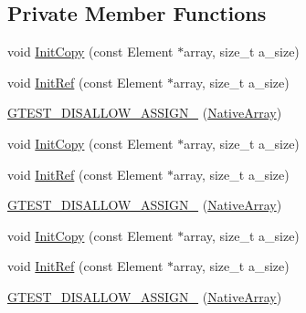\subsection*{Private Member Functions}
\begin{DoxyCompactItemize}
\item 
void \mbox{\hyperlink{classtesting_1_1internal_1_1_native_array_a8c0069cc09f559785fe4923fc118056f}{Init\+Copy}} (const Element $\ast$array, size\+\_\+t a\+\_\+size)
\item 
void \mbox{\hyperlink{classtesting_1_1internal_1_1_native_array_ac6ad6d79e17e2c98a9d4d684afcb7f79}{Init\+Ref}} (const Element $\ast$array, size\+\_\+t a\+\_\+size)
\item 
\mbox{\hyperlink{classtesting_1_1internal_1_1_native_array_a6633f3eab6947d4502fb1c69f95be66e}{G\+T\+E\+S\+T\+\_\+\+D\+I\+S\+A\+L\+L\+O\+W\+\_\+\+A\+S\+S\+I\+G\+N\+\_\+}} (\mbox{\hyperlink{classtesting_1_1internal_1_1_native_array}{Native\+Array}})
\item 
void \mbox{\hyperlink{classtesting_1_1internal_1_1_native_array_a8c0069cc09f559785fe4923fc118056f}{Init\+Copy}} (const Element $\ast$array, size\+\_\+t a\+\_\+size)
\item 
void \mbox{\hyperlink{classtesting_1_1internal_1_1_native_array_ac6ad6d79e17e2c98a9d4d684afcb7f79}{Init\+Ref}} (const Element $\ast$array, size\+\_\+t a\+\_\+size)
\item 
\mbox{\hyperlink{classtesting_1_1internal_1_1_native_array_a6633f3eab6947d4502fb1c69f95be66e}{G\+T\+E\+S\+T\+\_\+\+D\+I\+S\+A\+L\+L\+O\+W\+\_\+\+A\+S\+S\+I\+G\+N\+\_\+}} (\mbox{\hyperlink{classtesting_1_1internal_1_1_native_array}{Native\+Array}})
\item 
void \mbox{\hyperlink{classtesting_1_1internal_1_1_native_array_a8c0069cc09f559785fe4923fc118056f}{Init\+Copy}} (const Element $\ast$array, size\+\_\+t a\+\_\+size)
\item 
void \mbox{\hyperlink{classtesting_1_1internal_1_1_native_array_ac6ad6d79e17e2c98a9d4d684afcb7f79}{Init\+Ref}} (const Element $\ast$array, size\+\_\+t a\+\_\+size)
\item 
\mbox{\hyperlink{classtesting_1_1internal_1_1_native_array_a6633f3eab6947d4502fb1c69f95be66e}{G\+T\+E\+S\+T\+\_\+\+D\+I\+S\+A\+L\+L\+O\+W\+\_\+\+A\+S\+S\+I\+G\+N\+\_\+}} (\mbox{\hyperlink{classtesting_1_1internal_1_1_native_array}{Native\+Array}})
\end{DoxyCompactItemize}
